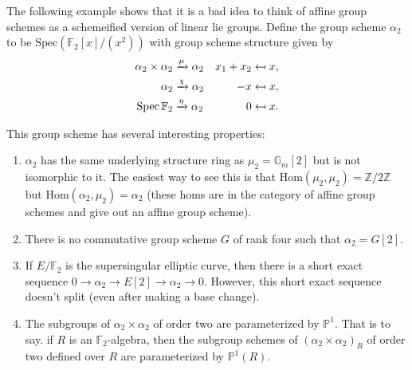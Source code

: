 \begin{example}
The following example shows that it is a bad idea to think of affine group schemes as a schemeified version of linear lie groups.  Define the group scheme $\alpha_2$ to be $\mathrm{Spec}(\mathbb{F}_2[x]/(x^2))$ with group scheme structure given by
\begin{align*}
\alpha_2 \times \alpha_2 &\xrightarrow{\mu} \alpha_2 & x_1 + x_2 & \mapsfrom x, \\
\alpha_2 & \xrightarrow{\chi} \alpha_2 & -x & \mapsfrom x, \\
\operatorname{Spec} \mathbb F_2 & \xrightarrow{\eta} \alpha_2 & 0 & \mapsfrom x.
\end{align*}

This group scheme has several interesting properties:
\begin{enumerate}
\item $\alpha_2$ has the same underlying structure ring as $\mu_2 = \mathbb{G}_m[2]$ but is not isomorphic to it.  The easiest way to see this is that $\mathrm{Hom}(\mu_2, \mu_2) = \mathbb{Z}/2\mathbb{Z}$ but $\mathrm{Hom}(\alpha_2, \mu_2) = \alpha_2$ (these homs are in the category of affine group schemes and give out an affine group scheme).  
\item There is no commutative group scheme $G$ of rank four such that $\alpha_2 = G[2]$.
\item If $E/\mathbb{F}_2$ is the supersingular elliptic curve, then there is a short exact sequence $0 \rightarrow \alpha_2 \rightarrow E[2] \rightarrow \alpha_2 \rightarrow 0$.  However, this short exact sequence doesn't split (even after making a base change).
\item The subgroups of $\alpha_2 \times \alpha_2$ of order two are parameterized by $\mathbb{P}^1$.  That is to say. if $R$ is an $\mathbb{F}_2$-algebra, then the subgroup schemes of $(\alpha_2 \times \alpha_2)_R$ of order two defined over $R$ are parameterized by $\mathbb{P}^1(R)$.
\end{enumerate}
\end{example}

